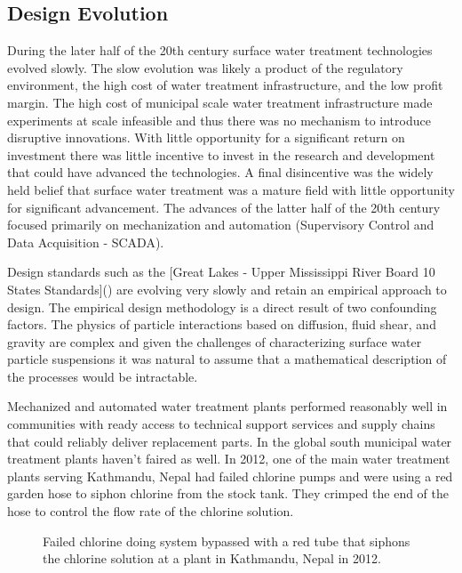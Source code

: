 \documentclass[letterpaper,10pt,english]{sphinxmanual}
\let\sphinxpxdimen\pdfpxdimen\else\newdimen\sphinxpxdimen
\begin{document}
\subsection{Design Evolution}
\label{\detokenize{Introduction/Introduction:design-evolution}}
During the later half of the 20th century surface water treatment technologies evolved slowly. The slow evolution was likely a product of the regulatory environment, the high cost of water treatment infrastructure, and the low profit margin. The high cost of municipal scale water treatment infrastructure made experiments at scale infeasible and thus there was no mechanism to introduce disruptive innovations. With little opportunity for a significant return on investment there was little incentive to invest in the research and development that could have advanced the technologies. A final disincentive was the widely held belief that surface water treatment was a mature field with little opportunity for significant advancement. The advances of the latter half of the 20th century focused primarily on mechanization and automation (Supervisory Control and Data Acquisition - SCADA).

Design standards such as the {[}Great Lakes - Upper Mississippi River Board 10 States Standards{]}() are evolving very slowly and retain an empirical approach to design. The empirical design methodology is a direct result of two confounding factors. The physics of particle interactions based on diffusion, fluid shear, and gravity are complex and given the challenges of characterizing surface water particle suspensions it was natural to assume that a mathematical description of the processes would be intractable.

Mechanized and automated water treatment plants performed reasonably well in communities with ready access to technical support services and supply chains that could reliably deliver replacement parts. In the global south municipal water treatment plants haven’t faired as well. In 2012, one of the main water treatment plants serving Kathmandu, Nepal had failed chlorine pumps and were using a red garden hose to siphon chlorine from the stock tank. They crimped the end of the hose to control the flow rate of the chlorine solution.

\begin{figure}[htbp]
\centering
\capstart

\noindent\sphinxincludegraphics[width=300\sphinxpxdimen]{{Kathmandu_chemical_feed_room}.png}
\caption{Failed chlorine doing system bypassed with a red tube that siphons the chlorine solution at a plant in Kathmandu, Nepal in 2012.}\label{\detokenize{Introduction/Introduction:id20}}\label{\detokenize{Introduction/Introduction:figure-kathmandu-chemical-feed-room}}\end{figure}
\end{document}
